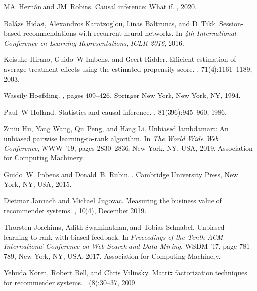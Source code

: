 \documentclass[manuscript,screen]{acmart}
\begin{document}
\begin{thebibliography}{10}
	MA~Hern{\'a}n and JM~Robins.
	\newblock Causal inference: What if.
	, 2020.
	
	Bal{\'a}zs Hidasi, Alexandros Karatzoglou, Linas Baltrunas, and D~Tikk.
	\newblock Session-based recommendations with recurrent neural networks.
	\newblock In {\em 4th International Conference on Learning Representations,
		ICLR 2016}, 2016.
	
	Keisuke Hirano, Guido~W Imbens, and Geert Ridder.
	\newblock Efficient estimation of average treatment effects using the estimated
	propensity score.
	, 71(4):1161--1189, 2003.
	
	Wassily Hoeffding.
	,
	pages 409--426.
	\newblock Springer New York, New York, NY, 1994.
	
	Paul~W Holland.
	\newblock Statistics and causal inference.
	,
	81(396):945--960, 1986.
	
	Ziniu Hu, Yang Wang, Qu~Peng, and Hang Li.
	\newblock Unbiased lambdamart: An unbiased pairwise learning-to-rank algorithm.
	\newblock In {\em The World Wide Web Conference}, WWW '19, pages
	2830--2836, New York, NY, USA, 2019. Association for Computing Machinery.
	
	Guido~W. Imbens and Donald~B. Rubin.
	.
	\newblock Cambridge University Press, New York, NY, USA, 2015.
	
	Dietmar Jannach and Michael Jugovac.
	\newblock Measuring the business value of recommender systems.
	, 10(4), December 2019.
	
	Thorsten Joachims, Adith Swaminathan, and Tobias Schnabel.
	\newblock Unbiased learning-to-rank with biased feedback.
	\newblock In {\em Proceedings of the Tenth ACM International Conference on Web
		Search and Data Mining}, WSDM '17, page 781--789, New York, NY, USA,
	2017. Association for Computing Machinery.
	
	Yehuda Koren, Robert Bell, and Chris Volinsky.
	\newblock Matrix factorization techniques for recommender systems.
	, (8):30--37, 2009.
	

\end{thebibliography}
\end{document}
